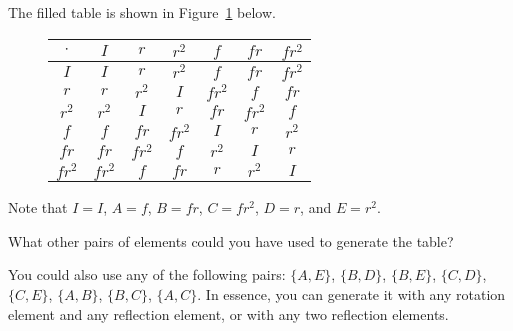 \documentclass[../gatm_answers.tex]{subfiles}
\begin{document}
\noindent The filled table is shown in Figure~\ref{fig:filled_alttable} below.

\begin{figure}[h]
	\begin{center}
		\begin{minipage}[b]{\textwidth}
			\centering
			\begin{tabular}{c|cccccc}
				\hline
				$\cdot$ & $I$ & $r$ & $r^2$ & $f$ & $fr$ & $fr^2$ \\ \hline 
				\rowcolor{light-gray}
				$I$ & $I$ & $r$ & $r^2$ & $f$ & $fr$ & $fr^2$ \\
				$r$ & $r$ & $r^2$ & $I$ & $fr^2$ & $f$ & $fr$ \\ 
				\rowcolor{light-gray}
				$r^2$ & $r^2$ & $I$ & $r$ & $fr$ & $fr^2$ & $f$ \\
				$f$ & $f$ & $fr$ & $fr^2$ & $I$ & $r$ & $r^2$ \\ 
				\rowcolor{light-gray}
				$fr$ & $fr$ & $fr^2$ & $f$ & $r^2$ & $I$ & $r$ \\
				$fr^2$ & $fr^2$ & $f$ & $fr$ & $r$ & $r^2$ & $I$ \\ \hline
			\end{tabular}
			\vspace*{0.5\baselineskip}
		\end{minipage}
	\end{center}
	\vspace*{-2\baselineskip}
	\begin{center}
		\begin{minipage}[t]{\textwidth}
			\label{fig:filled_alttable}
		\end{minipage}
	\end{center}
	\vspace*{-2\baselineskip}
\end{figure}

\noindent Note that $I=I$, $A=f$, $B=fr$, $C=fr^2$, $D=r$, and $E=r^2$.

\begin{outer_problem}
\item What other pairs of elements could you have used to generate the table?
\end{outer_problem}

\noindent You could also use any of the following pairs: $\{A,E\}$, $\{B,D\}$, $\{B,E\}$, $\{C,D\}$, $\{C,E\}$, $\{A,B\}$, $\{B,C\}$, $\{A,C\}$. In essence, you can generate it with any rotation element and any reflection element, or with any two reflection elements.
\end{document}
